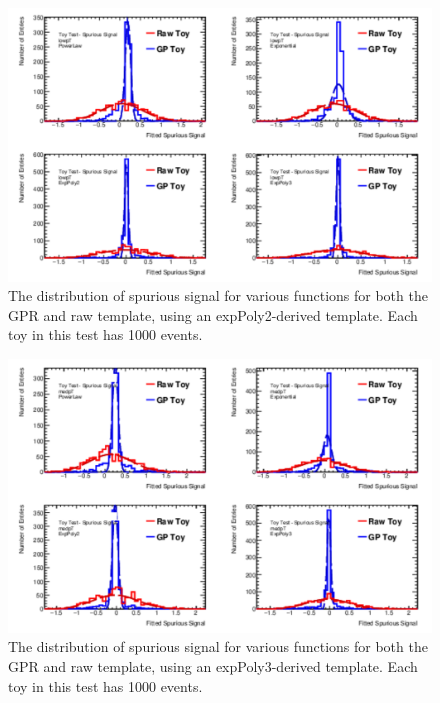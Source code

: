 \begin{figure} 
\begin{center}
  \includegraphics[width=\textwidth]{figures/background/gpr/validation/nominal/ToyTest_FitSigVals_lowpT_1000_noSig}   
\caption{The distribution of spurious signal for various functions for both the GPR and raw template, using an expPoly2-derived template. Each toy in this test has 1000 events.}
\label{fig:lowpt_1000_noSig}
\end{center}
\end{figure}

\begin{figure} 
\begin{center}
  \includegraphics[width=\textwidth]{figures/background/gpr/validation/nominal/ToyTest_FitSigVals_medpT_1000_noSig}   
\caption{The distribution of spurious signal for various functions for both the GPR and raw template, using an expPoly3-derived template. Each toy in this test has 1000 events.}
\label{fig:medpt_1000_noSig}
\end{center}
\end{figure}

